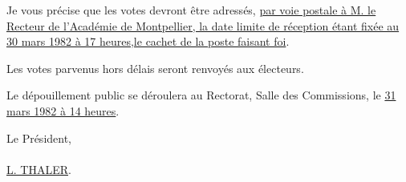 Je vous précise que les votes devront être adressés, \uline{par voie postale à M. le Recteur de l'Académie de Montpellier, la date limite de réception étant fixée au 30 mars 1982 à 17 heures,le cachet de la poste faisant foi}.

Les votes parvenus hors délais seront renvoyés aux électeurs.

Le dépouillement public se déroulera au Rectorat, Salle des Commissions, le \uline{31 mars 1982 à 14 heures}.

Le Président,\\
\\
\uline{L. THALER}.\\
